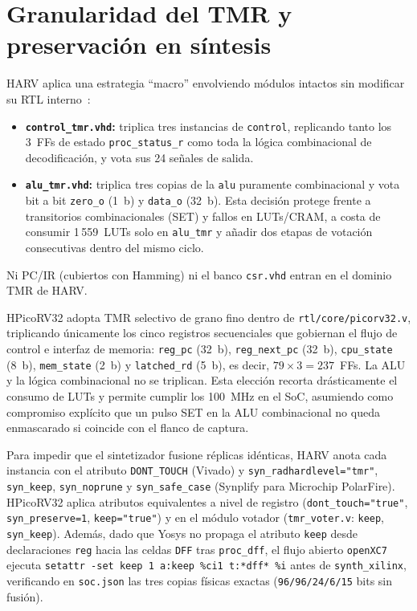 \documentclass[a4paper,10pt]{article}
\begin{document}
\section{Granularidad del TMR y preservación en síntesis}

HARV aplica una estrategia ``macro'' envolviendo módulos intactos sin modificar su RTL interno~\cite{santos2020dtis}:
\begin{itemize}
  \item \textbf{\texttt{control\_tmr.vhd}:} triplica tres instancias de \texttt{control}, replicando tanto los 3~FFs de estado \texttt{proc\_status\_r} como toda la lógica combinacional de decodificación, y vota sus 24 señales de salida.
  \item \textbf{\texttt{alu\_tmr.vhd}:} triplica tres copias de la \texttt{alu} puramente combinacional y vota bit a bit \texttt{zero\_o} (1~b) y \texttt{data\_o} (32~b). Esta decisión protege frente a transitorios combinacionales (SET) y fallos en LUTs/CRAM, a costa de consumir 1\,559~LUTs solo en \texttt{alu\_tmr} y añadir dos etapas de votación consecutivas dentro del mismo ciclo.
\end{itemize}
Ni PC/IR (cubiertos con Hamming) ni el banco \texttt{csr.vhd} entran en el dominio TMR de HARV.

HPicoRV32 adopta TMR selectivo de grano fino dentro de \texttt{rtl/core/picorv32.v}, triplicando únicamente los cinco registros secuenciales que gobiernan el flujo de control e interfaz de memoria: \texttt{reg\_pc} (32~b), \texttt{reg\_next\_pc} (32~b), \texttt{cpu\_state} (8~b), \texttt{mem\_state} (2~b) y \texttt{latched\_rd} (5~b), es decir, $79 \times 3 = 237$~FFs. La ALU y la lógica combinacional no se triplican. Esta elección recorta drásticamente el consumo de LUTs y permite cumplir los 100~MHz en el SoC, asumiendo como compromiso explícito que un pulso SET en la ALU combinacional no queda enmascarado si coincide con el flanco de captura.

Para impedir que el sintetizador fusione réplicas idénticas, HARV anota cada instancia con el atributo \texttt{DONT\_TOUCH} (Vivado) y \texttt{syn\_radhardlevel="tmr"}, \texttt{syn\_keep}, \texttt{syn\_noprune} y \texttt{syn\_safe\_case} (Synplify para Microchip PolarFire). HPicoRV32 aplica atributos equivalentes a nivel de registro (\texttt{dont\_touch="true"}, \texttt{syn\_preserve=1}, \texttt{keep="true"}) y en el módulo votador (\texttt{tmr\_voter.v}: \texttt{keep}, \texttt{syn\_keep}). Además, dado que Yosys no propaga el atributo \texttt{keep} desde declaraciones \texttt{reg} hacia las celdas \texttt{DFF} tras \texttt{proc\_dff}, el flujo abierto \texttt{openXC7} ejecuta \texttt{setattr -set keep 1 a:keep \%ci1 t:*dff* \%i} antes de \texttt{synth\_xilinx}, verificando en \texttt{soc.json} las tres copias físicas exactas (\texttt{96/96/24/6/15} bits sin fusión).
\end{document}
